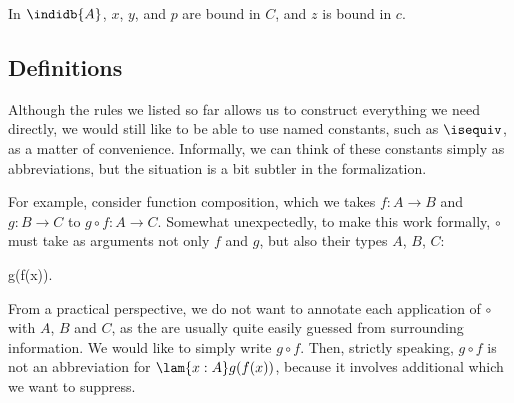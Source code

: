 %
In $\indidb{A}$, $x$, $y$, and $p$ are bound in $C$, and $z$ is bound in
$c$.

%

\subsection{Definitions}

%

Although the rules we listed so far allows us to construct everything we need directly, we
would still like to be able to use named constants, such as $\isequiv$, as a matter of
convenience. Informally, we can think of these constants simply as
abbreviations, but the situation is a bit subtler in the formalization.

For example, consider function composition, which we takes $f:A\to B$ and
$g:B\to C$ to $g\circ f:A\to C$. Somewhat unexpectedly, to make this work formally, $\circ$ must take as arguments not only $f$ and $g$, but also their types $A$, $B$, $C$:
%
\begin{narrowmultline*}
  {\circ}  {}
  \narrowbreak
   g(f(x)).
\end{narrowmultline*}
%
From a practical perspective, we do not want to annotate each application of
$\circ$ with $A$, $B$ and $C$, as the are usually quite easily guessed from surrounding information. We would like to simply write $g\circ f$.
Then, strictly speaking, $g \circ f$ is not an abbreviation for $\lam{x : A} g(f(x))$,
because it involves additional  which we want to suppress.

